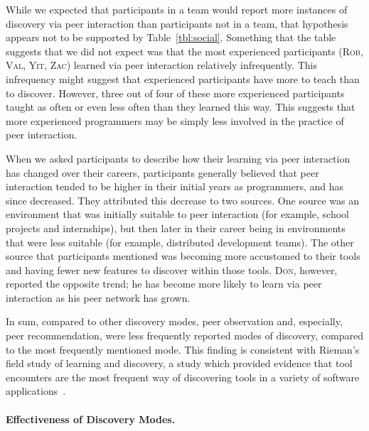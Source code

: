 \documentclass[smallextended]{svjour3}
\newcommand\discovery{peer interaction\xspace}
\newcommand\discpush{peer recommendation\xspace}
\newcommand\discpull{peer observation\xspace}
\newcommand\context{mode\xspace}
\newcommand\contexts{modes\xspace}
\newcommand\Contexts{Modes\xspace}
\newcommand{\subject}[1]{\textsc{#1}}
\newcommand{\asub}{{\subject{Zac}}\xspace}
\newcommand{\bsub}{{\subject{Rob}}\xspace}
\newcommand{\esub}{{\subject{Val}}\xspace}
\newcommand{\jsub}{{\subject{Yit}}\xspace}
\newcommand{\msub}{{\subject{Don}}\xspace}
\begin{document}
While we expected that participants in a team would report more instances of
discovery via \discovery than participants not in a team, that hypothesis appears
not to be supported by Table~\ref{tbl:social}.
Something that the table suggests that we did not expect was
that the most experienced participants (\bsub, \esub, \jsub, \asub) learned via
\discovery relatively infrequently.
This infrequency might suggest that experienced participants have more to teach than
to discover.
However, three out of four of these more experienced participants taught as often
or even less often than they learned this way.
This suggests that more
experienced programmers may be simply less involved in the practice of \discovery.


When we asked participants to describe how their learning via \discovery has
changed over their careers, participants generally believed that \discovery tended
to be higher in their initial years as programmers, and has since decreased.
They attributed this decrease to two sources.
One source was an environment that was initially suitable to \discovery
(for example, school projects and internships), but then later in
their career being in environments that were less suitable (for example,
distributed development teams).
The other source that participants mentioned was becoming more accustomed to
their tools and having fewer new features to discover within those tools. 
\msub, however, reported the opposite trend; he has become more
likely to learn via \discovery as his peer network has grown.


In sum, compared to other discovery \contexts, \discpull and,
especially, \discpush, were less frequently reported \contexts of discovery,
compared to the most frequently mentioned \context.
This finding is consistent with Rieman's field study of
learning and discovery, a study which provided evidence that 
tool encounters are the most frequent way of discovering tools 
in a variety of software applications~\cite{rieman}.

\paragraph{Effectiveness of Discovery \Contexts.}\label{sec:effective}
\end{document}
